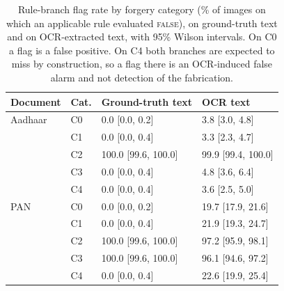 \begin{table}[t]
\caption{Rule-branch flag rate by forgery category (\% of images on
which an applicable rule evaluated \textsc{false}), on ground-truth
text and on OCR-extracted text, with 95\% Wilson intervals. On C0 a
flag is a false positive. On C4 both branches are expected to miss by
construction, so a flag there is an OCR-induced false alarm and not
detection of the fabrication.}
\label{tab:rulerate}
\centering
\footnotesize
\begin{tabular}{@{}llll@{}}
\toprule
Document & Cat. & Ground-truth text & OCR text \\
\midrule
Aadhaar & C0 & 0.0 [0.0, 0.2] & 3.8 [3.0, 4.8] \\
 & C1 & 0.0 [0.0, 0.4] & 3.3 [2.3, 4.7] \\
 & C2 & 100.0 [99.6, 100.0] & 99.9 [99.4, 100.0] \\
 & C3 & 0.0 [0.0, 0.4] & 4.8 [3.6, 6.4] \\
 & C4 & 0.0 [0.0, 0.4] & 3.6 [2.5, 5.0] \\
\midrule
PAN & C0 & 0.0 [0.0, 0.2] & 19.7 [17.9, 21.6] \\
 & C1 & 0.0 [0.0, 0.4] & 21.9 [19.3, 24.7] \\
 & C2 & 100.0 [99.6, 100.0] & 97.2 [95.9, 98.1] \\
 & C3 & 100.0 [99.6, 100.0] & 96.1 [94.6, 97.2] \\
 & C4 & 0.0 [0.0, 0.4] & 22.6 [19.9, 25.4] \\
\bottomrule
\end{tabular}
\end{table}
